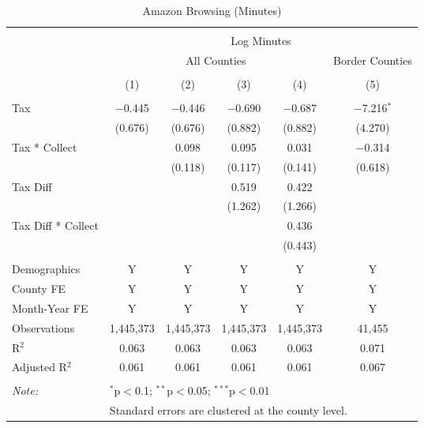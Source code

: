 
\begin{table}[!htbp] \centering 
  \caption{Amazon Browsing (Minutes)} 
  \label{tab:amazonTime} 
\begin{tabular}{@{\extracolsep{5pt}}lccccc} 
\\[-1.8ex]\hline 
\hline \\[-1.8ex] 
 & \multicolumn{5}{c}{Log Minutes} \\ 
\cline{2-6} 
 & \multicolumn{4}{c}{All Counties} & Border Counties \\ 
\\[-1.8ex] & (1) & (2) & (3) & (4) & (5)\\ 
\hline \\[-1.8ex] 
 Tax & $-$0.445 & $-$0.446 & $-$0.690 & $-$0.687 & $-$7.216$^{*}$ \\ 
  & (0.676) & (0.676) & (0.882) & (0.882) & (4.270) \\ 
  Tax * Collect &  & 0.098 & 0.095 & 0.031 & $-$0.314 \\ 
  &  & (0.118) & (0.117) & (0.141) & (0.618) \\ 
  Tax Diff &  &  & 0.519 & 0.422 &  \\ 
  &  &  & (1.262) & (1.266) &  \\ 
  Tax Diff * Collect &  &  &  & 0.436 &  \\ 
  &  &  &  & (0.443) &  \\ 
 \hline \\[-1.8ex] 
Demographics & Y & Y & Y & Y & Y \\ 
County FE & Y & Y & Y & Y & Y \\ 
Month-Year FE & Y & Y & Y & Y & Y \\ 
Observations & 1,445,373 & 1,445,373 & 1,445,373 & 1,445,373 & 41,455 \\ 
R$^{2}$ & 0.063 & 0.063 & 0.063 & 0.063 & 0.071 \\ 
Adjusted R$^{2}$ & 0.061 & 0.061 & 0.061 & 0.061 & 0.067 \\ 
\hline 
\hline \\[-1.8ex] 
\textit{Note:}  & \multicolumn{5}{l}{$^{*}$p$<$0.1; $^{**}$p$<$0.05; $^{***}$p$<$0.01} \\ 
 & \multicolumn{5}{l}{Standard errors are clustered at the county level.} \\ 
\end{tabular} 
\end{table} 
